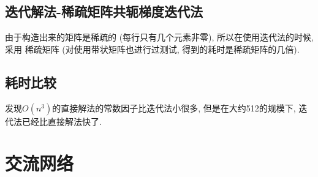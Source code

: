 \documentclass[UTF8]{ctexart}
\begin{document}
        \subsection{迭代解法-稀疏矩阵共轭梯度迭代法}
            \indent 由于构造出来的矩阵是稀疏的 (每行只有几个元素非零), 所以在使用迭代法的时候, 采用
            稀疏矩阵 (对使用带状矩阵也进行过测试, 得到的耗时是稀疏矩阵的几倍).
        \subsection{耗时比较}
            \indent 发现$O(n^3)$的直接解法的常数因子比迭代法小很多, 但是在大约512的规模下, 迭代法已经比直接解法快了.
    \section{交流网络}
\end{document}
